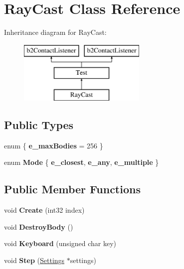 \hypertarget{class_ray_cast}{\section{Ray\-Cast Class Reference}
\label{class_ray_cast}
}
Inheritance diagram for Ray\-Cast\-:\begin{figure}[H]
\begin{center}
\leavevmode
\includegraphics[height=3.000000cm]{class_ray_cast}
\end{center}
\end{figure}
\subsection*{Public Types}
\begin{DoxyCompactItemize}
\item 
enum \{ {\bfseries e\-\_\-max\-Bodies} =  256
 \}
\item 
enum {\bfseries Mode} \{ {\bfseries e\-\_\-closest}, 
{\bfseries e\-\_\-any}, 
{\bfseries e\-\_\-multiple}
 \}
\end{DoxyCompactItemize}
\subsection*{Public Member Functions}
\begin{DoxyCompactItemize}
\item 
\hypertarget{class_ray_cast_a3aec9b6e5bf0608834a1da841cbface0}{void {\bfseries Create} (int32 index)}\label{class_ray_cast_a3aec9b6e5bf0608834a1da841cbface0}

\item 
\hypertarget{class_ray_cast_a24eac0856517394a4c0ebb06e59de0e2}{void {\bfseries Destroy\-Body} ()}\label{class_ray_cast_a24eac0856517394a4c0ebb06e59de0e2}

\item 
\hypertarget{class_ray_cast_a017fa25de327ec45ec5cf9341b0905d0}{void {\bfseries Keyboard} (unsigned char key)}\label{class_ray_cast_a017fa25de327ec45ec5cf9341b0905d0}

\item 
\hypertarget{class_ray_cast_a27d2fb90e8fc4ab3b080c51744bbbed5}{void {\bfseries Step} (\hyperlink{struct_settings}{Settings} $\ast$settings)}\label{class_ray_cast_a27d2fb90e8fc4ab3b080c51744bbbed5}

\end{DoxyCompactItemize}
